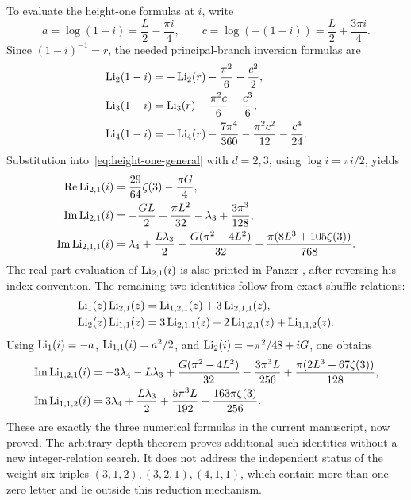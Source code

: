 To evaluate the height-one formulas at $i$, write
\[
 a=\log(1-i)=\frac L2-\frac{\pi i}{4},\qquad
 c=\log(-(1-i))=\frac L2+\frac{3\pi i}{4}.
\]
Since $(1-i)^{-1}=r$, the needed principal-branch inversion formulas are
\begin{align*}
 \operatorname{Li}_2(1-i)&=-\operatorname{Li}_2(r)-\frac{\pi^2}{6}-\frac{c^2}{2},\\
 \operatorname{Li}_3(1-i)&=\operatorname{Li}_3(r)-\frac{\pi^2c}{6}-\frac{c^3}{6},\\
 \operatorname{Li}_4(1-i)&=-\operatorname{Li}_4(r)-\frac{7\pi^4}{360}
                         -\frac{\pi^2c^2}{12}-\frac{c^4}{24}.
\end{align*}
Substitution into~\eqref{eq:height-one-general} with $d=2,3$, using
$\log i=\pi i/2$, yields
\begin{align*}
 \operatorname{Re}\operatorname{Li}_{2,1}(i)&=\frac{29}{64}\zeta(3)-\frac{\pi G}{4},\\
 \operatorname{Im}\operatorname{Li}_{2,1}(i)&=-\frac{GL}{2}
                   +\frac{\pi L^2}{32}-\lambda_3+\frac{3\pi^3}{128},\\
 \operatorname{Im}\operatorname{Li}_{2,1,1}(i)&=
 \lambda_4+\frac{L\lambda_3}{2}
 -\frac{G(\pi^2-4L^2)}{32}
 -\frac{\pi(8L^3+105\zeta(3))}{768}.
\end{align*}
The real-part evaluation of $\operatorname{Li}_{2,1}(i)$ is also printed in
Panzer \cite{Panzer}, after reversing his index convention.
The remaining two identities follow from exact shuffle relations:
\begin{align*}
 \operatorname{Li}_1(z)\operatorname{Li}_{2,1}(z)
    &=\operatorname{Li}_{1,2,1}(z)+3\operatorname{Li}_{2,1,1}(z),\\
 \operatorname{Li}_2(z)\operatorname{Li}_{1,1}(z)
    &=3\operatorname{Li}_{2,1,1}(z)+2\operatorname{Li}_{1,2,1}(z)+\operatorname{Li}_{1,1,2}(z).
\end{align*}
Using $\operatorname{Li}_1(i)=-a$, $\operatorname{Li}_{1,1}(i)=a^2/2$, and
$\operatorname{Li}_2(i)=-\pi^2/48+iG$, one obtains
\begin{align*}
 \operatorname{Im}\operatorname{Li}_{1,2,1}(i)
 &=-3\lambda_4-L\lambda_3
   +\frac{G(\pi^2-4L^2)}{32}
   -\frac{3\pi^3L}{256}
   +\frac{\pi(2L^3+67\zeta(3))}{128},\\
 \operatorname{Im}\operatorname{Li}_{1,1,2}(i)
 &=3\lambda_4+\frac{L\lambda_3}{2}
   +\frac{5\pi^3L}{192}-\frac{163\pi\zeta(3)}{256}.
\end{align*}
These are exactly the three numerical formulas in the current manuscript,
now proved. The arbitrary-depth theorem proves additional such identities
without a new integer-relation search. It does not address the independent
status of the weight-six triples $(3,1,2),(3,2,1),(4,1,1)$, which contain
more than one zero letter and lie outside this reduction mechanism.

